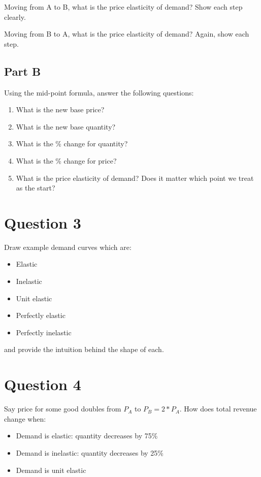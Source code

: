 \documentclass[12pt]{article}
\begin{document}
Moving from A to B, what is the price elasticity of demand? Show each step clearly.

\vspace{2mm}

Moving from B to A, what is the price elasticity of demand? Again, show each step.

\vspace{5mm}

\subsection*{Part B}
Using the mid-point formula, answer the following questions:
\begin{enumerate}
    \item What is the new base price?
    \item What is the new base quantity?
    \item What is the \% change for quantity?
    \item What is the \% change for price?
    \item What is the price elasticity of demand? Does it matter which point we treat as the start?
\end{enumerate}

\section*{Question 3}
Draw example demand curves which are:
\begin{itemize}
 \item Elastic
 \item Inelastic
 \item Unit elastic
 \item Perfectly elastic
 \item Perfectly inelastic
\end{itemize}
and provide the intuition behind the shape of each.

\vspace{2mm}

\section*{Question 4}
Say price for some good doubles from $P_A$ to $P_B = 2*P_A$. How does total revenue change when:
    \begin{itemize}
        \item Demand is elastic: quantity decreases by 75\%
        \item Demand is inelastic: quantity decreases by 25\%
        \item Demand is unit elastic
    \end{itemize}
\end{document}
